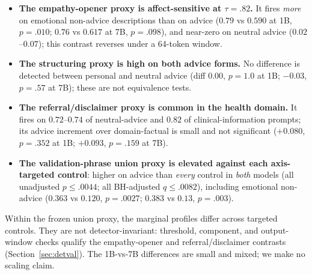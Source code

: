 \documentclass[11pt]{article}
\begin{document}
\begin{itemize}\itemsep2pt
\item \textbf{The empathy-opener proxy is affect-sensitive at $\tau=.82$.} It
fires \emph{more} on emotional non-advice descriptions than on advice ($0.79$ vs
$0.590$ at 1B, $p=.010$; $0.76$ vs $0.617$ at 7B, $p=.098$), and near-zero on
neutral advice ($0.02$--$0.07$); this contrast reverses under a 64-token window.
\item \textbf{The structuring proxy is high on both advice forms.} No difference
is detected between personal and neutral advice (diff $0.00$, $p=1.0$ at 1B;
$-0.03$, $p=.57$ at 7B); these are not equivalence tests.
\item \textbf{The referral/disclaimer proxy is common in the health domain.}
It fires on
$0.72$--$0.74$ of neutral-advice and $0.82$ of clinical-information
prompts; its advice increment over domain-factual is small and not significant
($+0.080$, $p=.352$ at 1B; $+0.093$, $p=.159$ at 7B).
\item \textbf{The validation-phrase union proxy is elevated against each
axis-targeted control}: higher on advice than
\emph{every} control in \emph{both} models (all unadjusted $p\leq.0044$; all
BH-adjusted $q\leq.0082$), including emotional non-advice ($0.363$ vs $0.120$, $p=.0027$;
$0.383$ vs $0.13$, $p=.003$).
\end{itemize}

Within the frozen union proxy, the marginal profiles differ across targeted
controls. They are not detector-invariant: threshold, component, and output-window
checks qualify the empathy-opener and referral/disclaimer contrasts
(Section~\ref{sec:detval}). The 1B-vs-7B differences are small and mixed; we make
no scaling claim.
\end{document}
